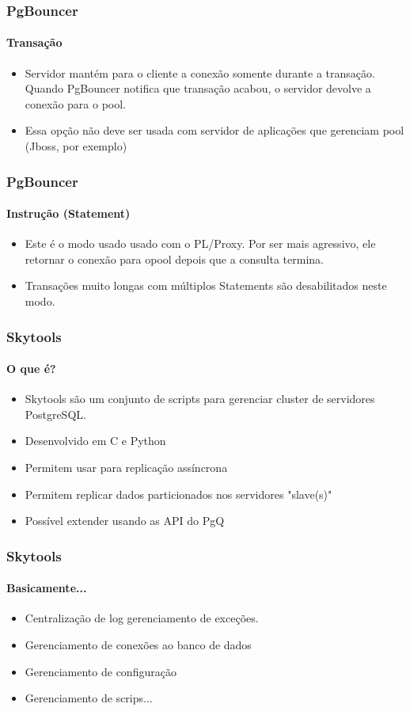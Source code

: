 \documentclass{beamer}
\begin{document}
\begin{frame}
    \frametitle{\textbf{PgBouncer}}
    \framesubtitle{Transação}
      \begin{itemize}
        \item Servidor mantém para o cliente a conexão somente durante a transação. Quando PgBouncer notifica que transação acabou, o servidor devolve a conexão para o pool. 
	\item Essa opção não deve ser usada com servidor de aplicações que gerenciam pool (Jboss, por exemplo)
      \end{itemize}
\end{frame}

\begin{frame}
    \frametitle{\textbf{PgBouncer}}
    \framesubtitle{Instrução (Statement)}
      \begin{itemize}
        \item Este é o modo usado usado com o PL/Proxy. Por ser mais agressivo, ele retornar o conexão para opool depois que a consulta termina.
	\item Transações muito longas com múltiplos Statements são desabilitados neste modo. 
      \end{itemize}

\end{frame}


\begin{frame}
    \frametitle{\textbf{Skytools}}
    \framesubtitle{O que é?}
      \begin{itemize}
        \item Skytools são um conjunto de scripts para gerenciar cluster de servidores PostgreSQL.
	\item Desenvolvido em C e Python
	\item Permitem usar para replicação assíncrona
	\item Permitem replicar dados particionados nos servidores "slave(s)"
	\item Possível extender usando as API do PgQ

      \end{itemize}


\end{frame}


\begin{frame}
    \frametitle{\textbf{Skytools}}
    \framesubtitle{Basicamente...}
      \begin{itemize}
        \item Centralização de log gerenciamento de exceções.
	\item Gerenciamento de conexões ao banco de dados
	\item Gerenciamento de configuração
	\item Gerenciamento de scrips...
      \end{itemize}
\end{frame}
\end{document}
